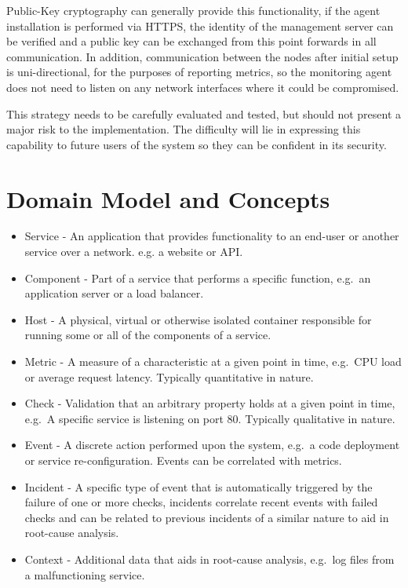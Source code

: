 \documentclass{cshonours}
\begin{document}
Public-Key cryptography can generally provide this functionality, if the agent installation is performed via HTTPS, the identity of the management server can be verified and a public key can be exchanged from this point forwards in all communication. In addition, communication between the nodes after initial setup is uni-directional, for the purposes of reporting metrics, so the monitoring agent does not need to listen on any network interfaces where it could be compromised.

This strategy needs to be carefully evaluated and tested, but should not present a major risk to the implementation. The difficulty will lie in expressing this capability to future users of the system so they can be confident in its security.

\pagebreak
\section{Domain Model and Concepts}

\begin{itemize}
  \item Service - An application that provides functionality to an end-user or another service over a network. e.g. a website or API.
  \item Component - Part of a service that performs a specific function, e.g.\ an application server or a load balancer.
  \item Host - A physical, virtual or otherwise isolated container responsible for running some or all of the components of a service.
  \item Metric - A measure of a characteristic at a given point in time, e.g.\ CPU load or average request latency. Typically quantitative in nature.
  \item Check - Validation that an arbitrary property holds at a given point in time, e.g.\ A specific service is listening on port 80. Typically qualitative in nature.
  \item Event - A discrete action performed upon the system, e.g.\ a code deployment or service re-configuration. Events can be correlated with metrics.
  \item Incident - A specific type of event that is automatically triggered by the failure of one or more checks, incidents correlate recent events with failed checks and can be related to previous incidents of a similar nature to aid in root-cause analysis.
  \item Context - Additional data that aids in root-cause analysis, e.g.\ log files from a malfunctioning service.
\end{itemize}
\end{document}
